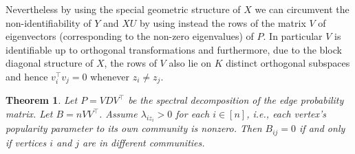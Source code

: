 \documentclass[
  12pt,
]{article}
\newtheorem{theorem}{Theorem}[section]
\theoremstyle{definition}
\theoremstyle{definition}
\theoremstyle{definition}
\theoremstyle{definition}
\theoremstyle{remark}
\begin{document}
Nevertheless by using the special geometric structure of \(X\) we can circumvent the
non-identifiability of \(Y\) and \(XU\) by using instead the rows of the
matrix \(V\) of eigenvectors (corresponding to the non-zero eigenvalues) of \(P\). In particular \(V\) is identifiable
up to orthogonal transformations and furthermore, due to the block
diagonal structure of \(X\), the rows of \(V\) also lie on \(K\) distinct orthogonal
subspaces and hence \(v_i^{\top} v_j = 0\) whenever \(z_i \not = z_j\).

\begin{theorem}
\label{thm:osc-p}
Let $P = V D V^\top$ be the spectral decomposition 
of the edge probability matrix. 
Let $B = n V V^\top$. 
Assume $\lambda_{i z_i} > 0$ for each $i \in [n]$, 
i.e., each vertex's popularity parameter to its own community is nonzero. 
Then $B_{ij} = 0$ if and only if 
vertices $i$ and $j$ are in different communities.
\end{theorem}
\end{document}
